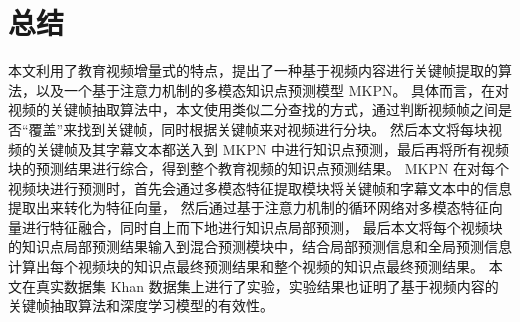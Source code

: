 \chapter{总结}
    本文利用了教育视频增量式的特点，提出了一种基于视频内容进行关键帧提取的算法，以及一个基于注意力机制的多模态知识点预测模型 MKPN。
    具体而言，在对视频的关键帧抽取算法中，本文使用类似二分查找的方式，通过判断视频帧之间是否“覆盖”来找到关键帧，同时根据关键帧来对视频进行分块。
    然后本文将每块视频的关键帧及其字幕文本都送入到 MKPN 中进行知识点预测，最后再将所有视频块的预测结果进行综合，得到整个教育视频的知识点预测结果。
    MKPN 在对每个视频块进行预测时，首先会通过多模态特征提取模块将关键帧和字幕文本中的信息提取出来转化为特征向量，
    然后通过基于注意力机制的循环网络对多模态特征向量进行特征融合，同时自上而下地进行知识点局部预测，
    最后本文将每个视频块的知识点局部预测结果输入到混合预测模块中，结合局部预测信息和全局预测信息计算出每个视频块的知识点最终预测结果和整个视频的知识点最终预测结果。
    本文在真实数据集 Khan 数据集上进行了实验，实验结果也证明了基于视频内容的关键帧抽取算法和深度学习模型的有效性。

